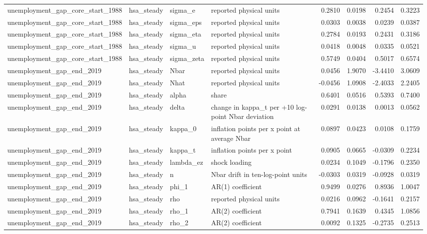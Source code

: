 \begin{tabular}{llllrrrr}
unemployment\_gap\_core\_start\_1988 & hsa\_steady & sigma\_e & reported physical units & 0.2810 & 0.0198 & 0.2454 & 0.3223 \\
unemployment\_gap\_core\_start\_1988 & hsa\_steady & sigma\_eps & reported physical units & 0.0303 & 0.0038 & 0.0239 & 0.0387 \\
unemployment\_gap\_core\_start\_1988 & hsa\_steady & sigma\_eta & reported physical units & 0.2784 & 0.0193 & 0.2431 & 0.3186 \\
unemployment\_gap\_core\_start\_1988 & hsa\_steady & sigma\_u & reported physical units & 0.0418 & 0.0048 & 0.0335 & 0.0521 \\
unemployment\_gap\_core\_start\_1988 & hsa\_steady & sigma\_zeta & reported physical units & 0.5749 & 0.0404 & 0.5017 & 0.6574 \\
unemployment\_gap\_end\_2019 & hsa\_steady & Nbar & reported physical units & 0.0456 & 1.9070 & -3.4410 & 3.0609 \\
unemployment\_gap\_end\_2019 & hsa\_steady & Nhat & reported physical units & -0.0456 & 1.0908 & -2.4033 & 2.2405 \\
unemployment\_gap\_end\_2019 & hsa\_steady & alpha & share & 0.6401 & 0.0516 & 0.5393 & 0.7400 \\
unemployment\_gap\_end\_2019 & hsa\_steady & delta & change in kappa\_t per +10 log-point Nbar deviation & 0.0291 & 0.0138 & 0.0013 & 0.0562 \\
unemployment\_gap\_end\_2019 & hsa\_steady & kappa\_0 & inflation points per x point at average Nbar & 0.0897 & 0.0423 & 0.0108 & 0.1759 \\
unemployment\_gap\_end\_2019 & hsa\_steady & kappa\_t & inflation points per x point & 0.0905 & 0.0665 & -0.0309 & 0.2234 \\
unemployment\_gap\_end\_2019 & hsa\_steady & lambda\_ez & shock loading & 0.0234 & 0.1049 & -0.1796 & 0.2350 \\
unemployment\_gap\_end\_2019 & hsa\_steady & n & Nbar drift in ten-log-point units & -0.0303 & 0.0319 & -0.0928 & 0.0319 \\
unemployment\_gap\_end\_2019 & hsa\_steady & phi\_1 & AR(1) coefficient & 0.9499 & 0.0276 & 0.8936 & 1.0047 \\
unemployment\_gap\_end\_2019 & hsa\_steady & rho & reported physical units & 0.0216 & 0.0962 & -0.1641 & 0.2157 \\
unemployment\_gap\_end\_2019 & hsa\_steady & rho\_1 & AR(2) coefficient & 0.7941 & 0.1639 & 0.4345 & 1.0856 \\
unemployment\_gap\_end\_2019 & hsa\_steady & rho\_2 & AR(2) coefficient & 0.0092 & 0.1325 & -0.2735 & 0.2513 \\

\end{tabular}
